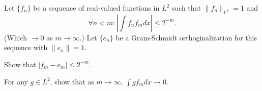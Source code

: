 Let $\{f_n\}$ be a sequence of real-valued functions in $L^2$ such
that $\|f_n\|_{L^2}=1$ and $$\forall n<m: |\int f_n f_m dx |\leq
2^{-m}.$$ (Which $\rightarrow 0$ as $m\rightarrow \infty$.) Let
$\{e_n\}$ be a Gram-Schmidt orthoginalization for this sequence with
$\|e_n\|=1$.
\begin{alist}
\item Show that $|f_m-e_m|\leq 2^{-m}$.
\item For any $g\in L^2$, show that as $m\rightarrow \infty$, $\int g
f_m dx \rightarrow 0$. 
\end{alist}
